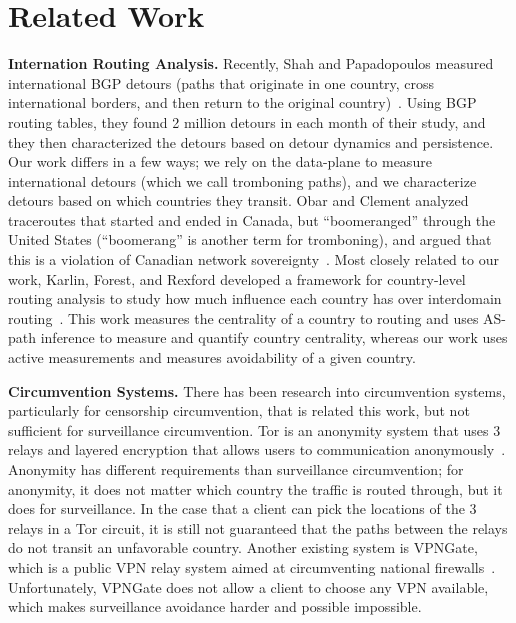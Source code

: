 \section{Related Work}
\label{related}

{\bf Internation Routing Analysis.}  Recently, Shah and Papadopoulos measured international BGP detours (paths that originate in one country, cross international borders, and then return to the original country)~\cite{shah2015characterizing}.  Using BGP routing tables, they found 2 million detours in each month of their study, and they then characterized the detours based on detour dynamics and persistence.  Our work differs in a few ways; we rely on the data-plane to measure international detours (which we call tromboning paths), and we characterize detours based on which countries they transit.  Obar and Clement analyzed traceroutes that started and ended in Canada, but ``boomeranged'' through the United States (``boomerang'' is another term for tromboning), and argued that this is a violation of Canadian network sovereignty~\cite{obar2012internet}.  Most closely related to our work, Karlin, Forest, and Rexford developed a framework for country-level routing analysis to study how much influence each country has over interdomain routing~\cite{karlin2009nation}.  This work measures the centrality of a country to routing and uses AS-path inference to measure and quantify country centrality, whereas our work uses active measurements and measures avoidability of a given country.

{\bf Circumvention Systems.}  There has been research into circumvention systems, particularly for censorship circumvention, that is related this work, but not sufficient for surveillance circumvention.  Tor is an anonymity system that uses 3 relays and layered encryption that allows users to communication anonymously~\cite{dingledine2004tor}.  Anonymity has different requirements than surveillance circumvention; for anonymity, it does not matter which country the traffic is routed through, but it does for surveillance.  In the case that a client can pick the locations of the 3 relays in a Tor circuit, it is still not guaranteed that the paths between the relays do not transit an unfavorable country.  Another existing system is VPNGate, which is a public VPN relay system aimed at circumventing national firewalls~\cite{nobori2014vpn}.  Unfortunately, VPNGate does not allow a client to choose any VPN available, which makes surveillance avoidance harder and possible impossible.

